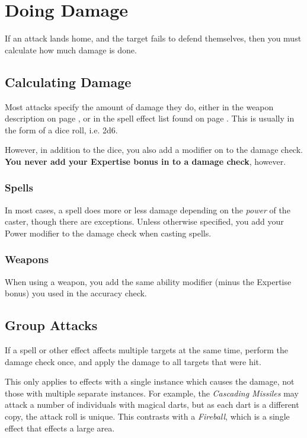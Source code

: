 

\section{Doing Damage} \label{S:Damage}

If an attack lands home, and the target fails to defend themselves, then you must calculate how much damage is done.

\subsection{Calculating Damage}

Most attacks specify the amount of damage they do, either in the weapon description on page \pageref{S:WeaponList}, or in the spell effect list found on page \pageref{S:SpellList}. This is usually in the form of a dice roll, i.e. 2d6.

However, in addition to the dice, you also add a modifier on to the damage check. {\bf You never add your Expertise bonus in to a damage check}, however. 

\subsubsection{Spells}

In most cases, a spell does more or less damage depending on the {\it power} of the caster, though there are exceptions. Unless otherwise specified, you add your Power modifier to the damage check when casting spells. 

\subsubsection{Weapons}

When using a weapon, you add the same ability modifier (minus the Expertise bonus) you used in the accuracy check. 

\subsection{Group Attacks}

If a spell or other effect affects multiple targets at the same time, perform the damage check once, and apply the damage to all targets that were hit. 

This only applies to effects with a single instance which causes the damage, not those with multiple separate instances. For example, the {\it Cascading Missiles} may attack a number of individuals with magical darts, but as each dart is a different copy, the attack roll is unique. This contrasts with a {\it Fireball}, which is a single effect that effects a large area. 

